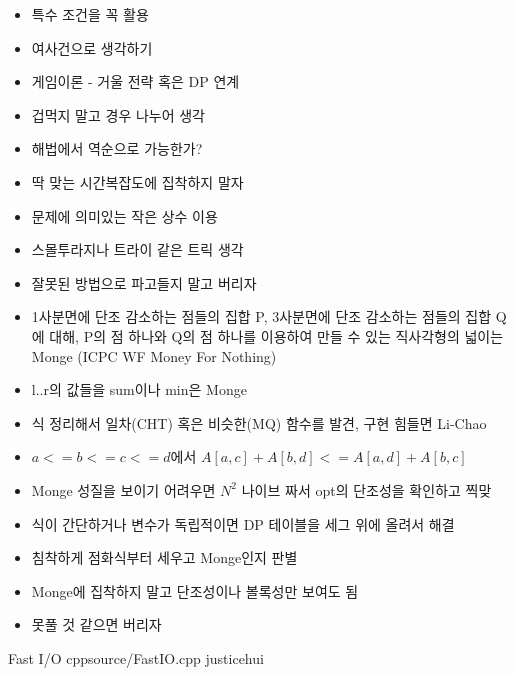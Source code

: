 \documentclass[landscape, 10pt, a4paper, oneside, twocolumn]{extarticle}
\begin{document}
\begin{itemize}
\item 특수 조건을 꼭 활용
\item 여사건으로 생각하기
\item 게임이론 - 거울 전략 혹은 DP 연계
\item 겁먹지 말고 경우 나누어 생각
\item 해법에서 역순으로 가능한가?
\item 딱 맞는 시간복잡도에 집착하지 말자
\item 문제에 의미있는 작은 상수 이용
\item 스몰투라지나 트라이 같은 트릭 생각
\item 잘못된 방법으로 파고들지 말고 버리자
\end{itemize}

\begin{itemize}
    \item 1사분면에 단조 감소하는 점들의 집합 P, 3사분면에 단조 감소하는 점들의 집합 Q에 대해, P의 점 하나와 Q의 점 하나를 이용하여 만들 수 있는 직사각형의 넓이는 Monge (ICPC WF Money For Nothing)
    \item l..r의 값들을 sum이나 min은 Monge

    \item 식 정리해서 일차(CHT) 혹은 비슷한(MQ) 함수를 발견, 구현 힘들면 Li-Chao
    \item $a <= b <= c <= d$에서 $A[a,c] + A[b,d] <= A[a,d] + A[b,c]$
    \item Monge 성질을 보이기 어려우면 $N^2$ 나이브 짜서 opt의 단조성을 확인하고 찍맞
    \item 식이 간단하거나 변수가 독립적이면 DP 테이블을 세그 위에 올려서 해결
    \item 침착하게 점화식부터 세우고 Monge인지 판별
    \item Monge에 집착하지 말고 단조성이나 볼록성만 보여도 됨
    \item 못풀 것 같으면 버리자
\end{itemize}

\Algorithm
{Fast I/O}
{}
{}
{cpp}{source/FastIO.cpp}
{justicehui}
\end{document}
